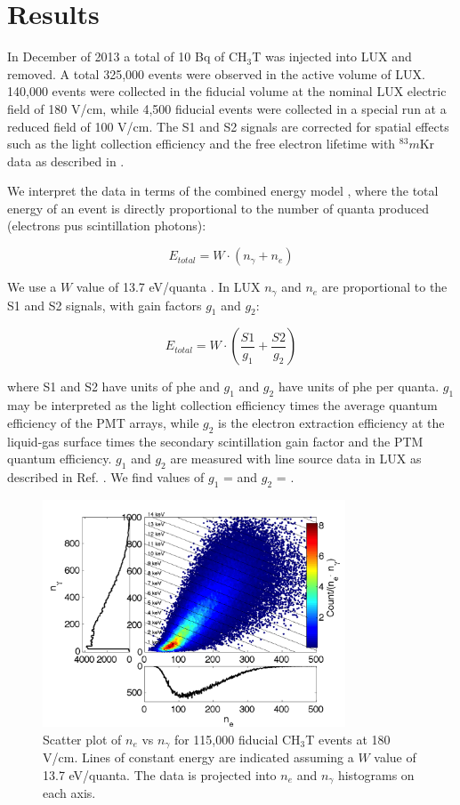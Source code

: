 \section{Results}

In December of 2013 a total of 10 Bq of CH$_3$T was injected into LUX and removed. A total 325,000 events were observed in the active volume of LUX. 140,000 events were collected in the fiducial volume at the nominal LUX electric field of 180 V/cm, while 4,500 fiducial events were collected in a special run at a reduced field of 100 V/cm. The S1 and S2 signals are corrected for spatial effects such as the light collection efficiency and the free electron lifetime with $^83m$Kr data as described in \cite{lux-reanalysis}. 

We interpret the data in terms of the combined energy model \cite{platzmann}, where the total energy of an event is directly proportional to the number of quanta produced (electrons pus scintillation photons):

\begin{displaymath}
E_{total} = W \cdot (n_{\gamma} + n_e )
\end{displaymath}

\noindent
We use a $W$ value of 13.7 eV/quanta \cite{Dahl}. In LUX $n_{\gamma}$ and $n_e$ are proportional to the S1 and S2 signals, with gain factors $g_1$ and $g_2$:

\begin{displaymath}
E_{total} = W \cdot (\frac{S1}{g_1} + \frac{S2}{g_2} )
\end{displaymath}

\noindent
where S1 and S2 have units of phe and $g_1$ and $g_2$ have units of phe per quanta. $g_1$ may be interpreted as the light collection efficiency times the average quantum efficiency of the PMT arrays, while $g_2$ is the electron extraction efficiency at the liquid-gas surface times the secondary scintillation gain factor and the PTM quantum efficiency. $g_1$ and $g_2$ are measured with line source data in LUX as described in Ref. \cite{lux-reanalysis, lux-prd}. We find values of $g_1$ = \gone and $g_2$ = \gtwo.

\begin{figure}[h!]\centering
\includegraphics[width=90mm]{fig/tritium-scatter.png}
\caption{Scatter plot of $n_e$ vs $n_{\gamma}$ for 115,000 fiducial CH$_3$T events at 180 V/cm. Lines of constant energy are indicated assuming a $W$ value of 13.7 eV/quanta. The data is projected into $n_e$ and $n_{\gamma}$ histograms on each axis.}
\label{fig:tritium-scatter}
\end{figure}


